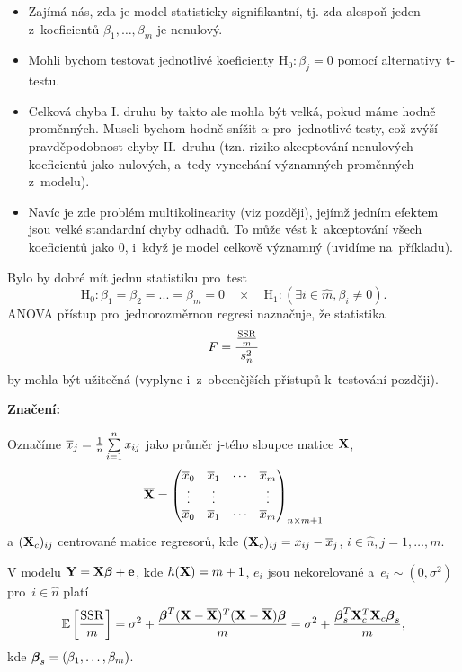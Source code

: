 \begin{itemize}
\item Zajímá nás, zda je model statisticky signifikantní, tj. zda alespoň jeden z~koeficientů $\beta_1,\dots, \beta_m$ je nenulový.
\item Mohli bychom testovat jednotlivé koeficienty $\text{H}_0 : \beta_j = 0$ pomocí alternativy t-testu.
\item Celková chyba I. druhu by takto ale mohla být velká, pokud máme hodně proměnných. Museli bychom hodně snížit $\alpha$ pro~jednotlivé testy, což zvýší pravděpodobnost chyby II.~druhu (tzn. riziko akceptování nenulových koeficientů jako nulových, a~tedy vynechání významných proměnných z~modelu).
\item Navíc je zde problém multikolinearity (viz později), jejímž jedním efektem jsou velké standardní chyby odhadů. To může vést k~akceptování všech koeficientů jako 0, i~když je model celkově významný (uvidíme na~příkladu).
\end{itemize}

Bylo by dobré mít jednu statistiku pro~test
 $$
\text{H}_0 : \beta_1 = \beta_2 = ... = \beta_m = 0 \quad \times \quad \text{H}_1 : (\exists i\in \widehat{m}, \beta_i \neq 0).
 $$
ANOVA přístup pro~jednorozměrnou regresi naznačuje, že statistika
 $$
F = \frac{\frac{\mathrm{SSR}}{m}}{s_n^2}
 $$
by mohla být užitečná (vyplyne i~z~obecnějších přístupů k~testování později).

\textbf{Značení:}

Označíme $\overline{x}_j = \frac{1}{n} \sum\limits_{i=1}^{n} x_{ij}$ jako průměr j-tého sloupce matice $\mathbf{X}$,
 $$
	\overline{\mathbf{X}} = \begin{pmatrix}
	\overline{x}_0 & \overline{x}_1 & \cdots & \overline{x}_m \\
	\vdots & \vdots & & \vdots \\
	\overline{x}_0 & \overline{x}_1 & \cdots & \overline{x}_m
	\end{pmatrix}_{n \times m+1} 
 $$
 a $(\mathbf{X}_c)_{ij}$ centrované matice regresorů, kde $(\mathbf{X}_c)_{ij} = x_{ij} - \overline{x}_j$, $i\in\widehat{n}, j = 1,\dots, m$.

\begin{theorem}
	V modelu $\mathbf{Y} = \mathbf{X} \boldsymbol{\beta} + \mathbf{e}$, kde $h(\mathbf{X}) = m + 1$, $e_i$ jsou nekorelované a~$e_i \sim (0,\sigma^2)$ pro~$i  \in\widehat{n} $ platí
	 $$
		\mathbb{E} \left[\frac{\mathrm{SSR}}{m} \right] = \sigma^2 + \frac{\boldsymbol{\beta}^T(\mathbf{X} - \overline{\mathbf{X}})^T(\mathbf{X} - \overline{\mathbf{X}}) \boldsymbol{\beta}}{m} = \sigma^2 + \frac{\boldsymbol{\beta}_s^T \mathbf{X}_c^T \mathbf{X}_c \boldsymbol{\beta}_s}{m},
	 $$
	kde $\boldsymbol{\beta}_s = (\beta_1,\dots, \beta_m)$.
\end{theorem}

